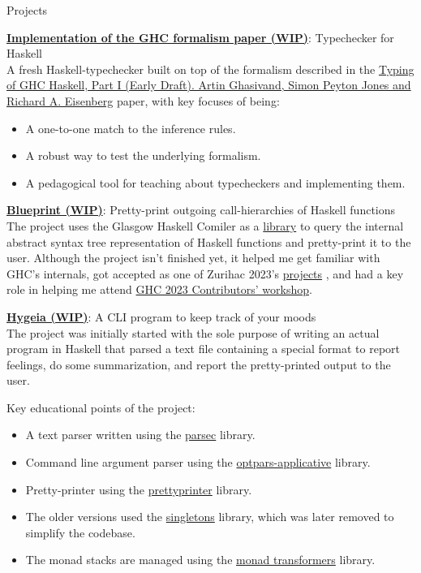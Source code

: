 \documentclass[
	a4paper,
	11pt,
]{resume}
\begin{document}
\begin{rSection}{Projects}

  \href{https://gitlab.haskell.org/Ei30metry/haskell}{\textbf{Implementation of the GHC formalism paper (WIP)}}: Typechecker for Haskell \\
  A fresh Haskell-typechecker built on top of the formalism described in the
  \href{https://gitlab.haskell.org/Ei30metry/haskell/-/jobs/artifacts/wip/term/raw/haskell.pdf?job=build-pdf}
  {Typing of GHC Haskell, Part I (Early Draft). Artin Ghasivand, Simon Peyton Jones and Richard A. Eisenberg} paper, with key focuses of being:
  \begin{itemize}
  \item A one-to-one match to the inference rules.
  \item A robust way to test the underlying formalism.
  \item A pedagogical tool for teaching about typecheckers and implementing them.
  \end{itemize}

  \href{https://github.com/Ei30metry/blueprint}{\textbf{Blueprint (WIP)}}: Pretty-print outgoing call-hierarchies of Haskell functions \\
  The project uses the Glasgow Haskell Comiler as a \href{https://hackage.haskell.org/package/ghc}{library} to query the internal
  abstract syntax tree representation of Haskell functions and pretty-print it to the user.
  Although the project isn't finished yet, it helped me get familiar with GHC's internals, got accepted as one of Zurihac 2023's \href{https://zfoh.ch/zurihac2023/projects/}{projects}
  , and had a key role in helping me attend \href{https://haskell.foundation/events/2023-ghc-development-workshop.html}{GHC 2023 Contributors' workshop}.

  \href{https://github.com/Ei30metry/Hygeia}{\textbf{Hygeia (WIP)}}: A CLI program to keep track of your moods \\
  The project was initially started with the sole purpose of writing an actual program in Haskell that parsed
  a text file containing a special format to report feelings, do some summarization, and report the pretty-printed
  output to the user.

  Key educational points of the project:
  \begin{itemize}
  \item A text parser written using the \href{https://hackage.haskell.org/package/parsec}{parsec} library.
  \item Command line argument parser using the \href{https://hackage.haskell.org/package/optparse-applicative}{optpars-applicative} library.
  \item Pretty-printer using the \href{https://hackage.haskell.org/package/prettyprinter}{prettyprinter} library.
  \item The older versions used the \href{https://hackage.haskell.org/package/singletons}{singletons} library, which was later removed to simplify the codebase.
  \item The monad stacks are managed using the \href{https://hackage.haskell.org/package/mtl}{monad transformers} library.
  \end{itemize}


\end{rSection}
\end{document}
